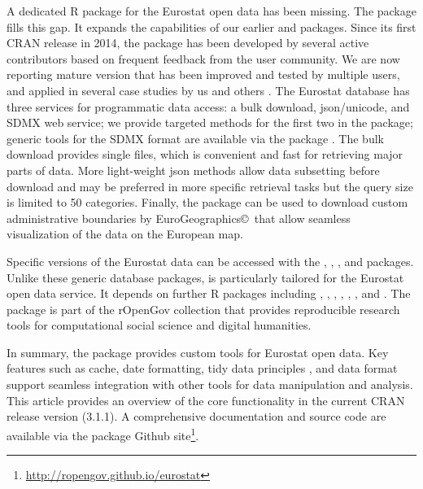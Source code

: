 A dedicated R package for the Eurostat open data has been missing. The  package fills this gap. It expands the capabilities of our earlier  \citep{statfi} and  \citep{smarterpoland} packages. Since its first CRAN release in 2014, the  package has been developed by several active contributors based on frequent feedback from the user community. We are now reporting mature version that has been improved and tested by multiple users, and applied in several case studies by us and others \citep{Kenett2016}. The Eurostat database has three services for programmatic data access: a bulk download, json/unicode, and SDMX web service; we provide targeted methods for the first two in the  package; generic tools for the SDMX format are available via the  package \citep{rsdmx}. The bulk download provides single files, which is convenient and fast for retrieving major parts of data. More light-weight json methods allow data subsetting before download and may be preferred in more specific retrieval tasks but the query size is limited to 50 categories. Finally, the package can be used to download custom administrative boundaries by EuroGeographics\copyright \ that allow seamless visualization of the data on the European map.

Specific versions of the Eurostat data can be accessed with the  \citep{datamart},  \citep{quandl},  \citep{pdfetch}, and  \citep{rsdmx} packages. Unlike these generic database packages,  is particularly tailored for the Eurostat open data service. It depends on further R packages including
 \citep{classInt},
 \citep{httr},
 \citep{jsonlite},
 \citep{readr},
 \citep{sp},
 \citep{stringi}, and
 \citep{stringr}. The  package is part of the rOpenGov collection \citep{Lahti13icml} that provides reproducible research tools for computational social science and digital humanities.

In summary, the  package provides custom tools for Eurostat open data. Key features such as cache, date formatting, tidy data principles \citep{wickham2014}, and  \citep{tibble} data format support seamless integration with other tools for data manipulation and analysis. This article provides an overview of the core functionality in the current CRAN release version (3.1.1). A comprehensive documentation and source code are available via the package Github site\footnote{\url{http://ropengov.github.io/eurostat}}.


